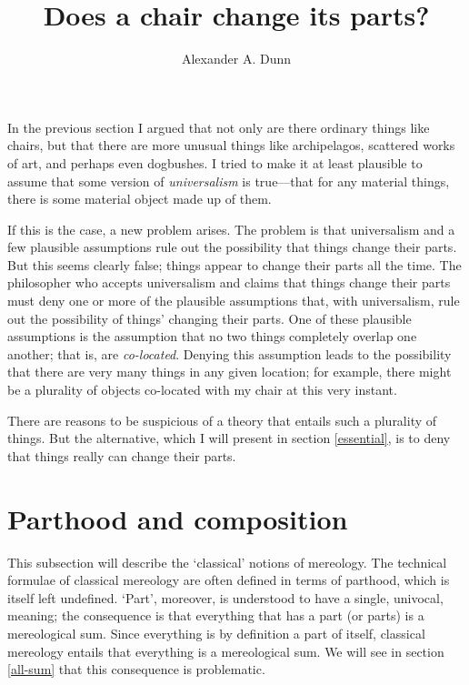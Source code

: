 \documentclass[11pt]{article}
\title{Does a chair change its parts?}
\author{Alexander A. Dunn}
\begin{document}
\ifstandalone
\maketitle
\begin{spacing}{1.5}
\fi

\label{parts}

In the previous section I argued that not only are there ordinary
things like chairs, but that there are more unusual things like
archipelagos, scattered works of art, and perhaps even dogbushes.  I
tried to make it at least plausible to assume that some version of
{\em universalism} is true---that for any material things, there is
some material object made up of them.

If this is the case, a new problem arises.  The problem is that
universalism and a few plausible assumptions rule out the possibility
that things change their parts.  But this seems clearly false; things
appear to change their parts all the time.  The philosopher who
accepts universalism and claims that things change their parts must
deny one or more of the plausible assumptions that, with universalism,
rule out the possibility of things' changing their parts.  One of
these plausible assumptions is the assumption that no two things
completely overlap one another; that is, are {\em co-located}.
Denying this assumption leads to the possibility that there are very
many things in any given location; for example, there might be a
plurality of objects co-located with my chair at this very instant.

There are reasons to be suspicious of a theory that entails such a
plurality of things.  But the alternative, which I will present in
section \ref{essential}, is to deny that things really can change
their parts.

\section{Parthood and composition}
\label{tech}
This subsection will describe the `classical' notions of mereology.
The technical formulae of classical mereology are often defined in
terms of parthood, which is itself left undefined.  `Part', moreover,
is understood to have a single, univocal, meaning; the consequence is
that everything that has a part (or parts) is a mereological sum.
Since everything is by definition a part of itself, classical
mereology entails that everything is a mereological sum.  We will see
in section \ref{all-sum} that this consequence is problematic.


\end{spacing}
\end{document}
